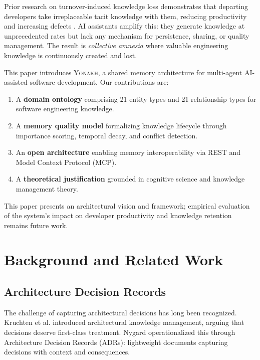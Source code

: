 \documentclass[10pt,journal,compsoc]{IEEEtran}
\newcommand{\yonakh}{\textsc{Yonakh}}
\begin{document}
Prior research on turnover-induced knowledge loss demonstrates that departing developers take irreplaceable tacit knowledge with them, reducing productivity and increasing defects \cite{rigby2016quantifying,nassif2021turnover}. AI assistants amplify this: they generate knowledge at unprecedented rates but lack any mechanism for persistence, sharing, or quality management. The result is \emph{collective amnesia} where valuable engineering knowledge is continuously created and lost.

This paper introduces \yonakh, a shared memory architecture for multi-agent AI-assisted software development. Our contributions are:

\begin{enumerate}
\item A \textbf{domain ontology} comprising 21 entity types and 21 relationship types for software engineering knowledge.

\item A \textbf{memory quality model} formalizing knowledge lifecycle through importance scoring, temporal decay, and conflict detection.

\item An \textbf{open architecture} enabling memory interoperability via REST and Model Context Protocol (MCP).

\item A \textbf{theoretical justification} grounded in cognitive science and knowledge management theory.
\end{enumerate}

This paper presents an architectural vision and framework; empirical evaluation of the system's impact on developer productivity and knowledge retention remains future work.

\section{Background and Related Work}

\subsection{Architecture Decision Records}

The challenge of capturing architectural decisions has long been recognized. Kruchten et al. \cite{kruchten2006decision} introduced architectural knowledge management, arguing that decisions deserve first-class treatment. Nygard \cite{nygard2011adr} operationalized this through Architecture Decision Records (ADRs): lightweight documents capturing decisions with context and consequences.
\end{document}

